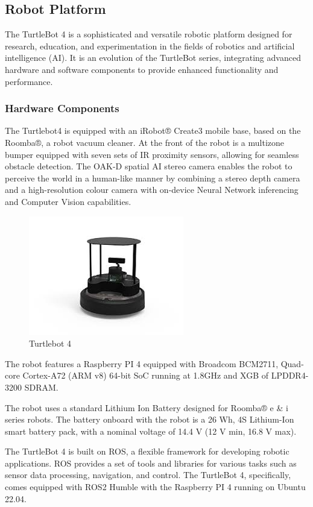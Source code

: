 \subsection{Robot Platform}

The TurtleBot 4 is a sophisticated and versatile robotic platform designed for research, education, and experimentation in the fields of robotics and artificial intelligence (AI). It is an evolution of the TurtleBot series, integrating advanced hardware and software components to provide enhanced functionality and performance.

\subsubsection{Hardware Components}
The Turtlebot4 is equipped with an iRobot® Create3 mobile base, based on the Roomba®, a robot vacuum cleaner. At the front of the robot is a multizone bumper equipped with seven sets of IR proximity sensors, allowing for seamless obstacle detection. The OAK-D spatial AI stereo camera enables the robot to perceive the world in a human-like manner by combining a stereo depth camera and a high-resolution colour camera with on-device Neural Network inferencing and Computer Vision capabilities.

\begin{figure}[!htb]
    \centering{}
    \includegraphics[scale=0.5]{m+m_images/tb4.jpg}
    \caption{Turtlebot 4}
    \label{figure:tb4}
\end{figure}


The robot features a Raspberry PI 4 equipped with Broadcom BCM2711, Quad-core Cortex-A72 (ARM v8) 64-bit SoC running at 1.8GHz and XGB of LPDDR4-3200 SDRAM.

The robot uses a standard Lithium Ion Battery designed for Roomba® e \& i series robots. The battery onboard with the robot is a 26 Wh, 4S Lithium-Ion smart battery pack, with a nominal voltage of 14.4 V (12 V min, 16.8 V max).

The TurtleBot 4 is built on ROS, a flexible framework for developing robotic applications. ROS provides a set of tools and libraries for various tasks such as sensor data processing, navigation, and control. The TurtleBot 4, specifically, comes equipped with ROS2 Humble with the Raspberry PI 4 running on Ubuntu 22.04.

